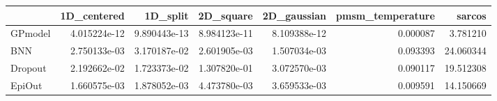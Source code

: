 \begin{tabular}{lrrrrrr}
\toprule
{} &   1D\_centered &      1D\_split &     2D\_square &   2D\_gaussian &  pmsm\_temperature &     sarcos \\
\midrule
GPmodel &  4.015224e-12 &  9.890443e-13 &  8.984123e-11 &  8.109388e-12 &          0.000087 &   3.781210 \\
BNN     &  2.750133e-03 &  3.170187e-02 &  2.601905e-03 &  1.507034e-03 &          0.093393 &  24.060344 \\
Dropout &  2.192662e-02 &  1.723373e-02 &  1.307820e-01 &  3.072570e-03 &          0.090117 &  19.512308 \\
EpiOut  &  1.660575e-03 &  1.878052e-03 &  4.473780e-03 &  3.659533e-03 &          0.009591 &  14.150669 \\
\bottomrule
\end{tabular}
